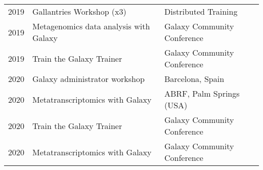 \begin{table}
\begin{tabular}{lll}
        2019 & Gallantries Workshop (x3)                       & Distributed Training \\
        2019 & Metagenomics data analysis with Galaxy          & Galaxy Community Conference \\
        2019 & Train the Galaxy Trainer                        & Galaxy Community Conference \\
        2020 & Galaxy administrator workshop                   & Barcelona, Spain \\
        2020 & Metatranscriptomics with Galaxy                 & ABRF, Palm Springs (USA) \\
        2020 & Train the Galaxy Trainer                        & Galaxy Community Conference \\
        2020 & Metatranscriptomics with Galaxy                 & Galaxy Community Conference \\
    \end{tabular}
\end{table}

\normalsize
